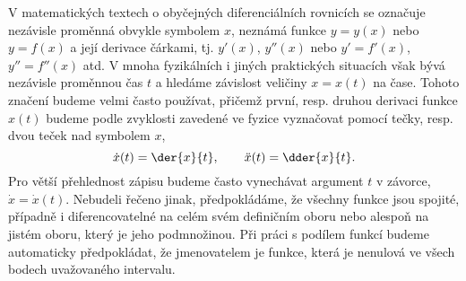     \begin{mdframed}[style=mdnote] 
      V matematických textech o obyčejných diferenciálních rovnicích se označuje nezávisle proměnná
      obvykle symbolem \(x\), neznámá funkce \(y = y(x)\) nebo \(y = f(x)\) a její derivace čárkami,
      tj. \(y'(x)\), \(y''(x)\) nebo \(y' = f'(x)\), \(y'' = f''(x)\) atd. V mnoha fyzikálních i
      jiných praktických situacích však bývá nezávisle proměnnou čas \(t\) a hledáme závislost
      veličiny \(x = x(t)\) na čase. Tohoto značení budeme velmi často používat, přičemž první,
      resp. druhou derivaci funkce \(x(t)\) budeme podle zvyklosti zavedené ve fyzice vyznačovat
      pomocí tečky, resp. dvou teček nad symbolem \(x\),
      \begin{equation*}
        \dot{x}(t) = \der{x}{t}, \qquad \ddot{x}(t) = \dder{x}{t}.
      \end{equation*}
      Pro větší přehlednost zápisu budeme často vynechávat argument \(t\) v závorce, \(\dot{x} = 
      \dot{x}(t)\). Nebudeli řečeno jinak, předpokládáme, že všechny funkce jsou spojité, případně 
      i diferencovatelné na celém svém definičním oboru nebo alespoň na jistém oboru, který je jeho 
      podmnožinou. Při práci s podílem funkcí budeme automaticky předpokládat, že jmenovatelem je 
      funkce, která je nenulová ve všech bodech uvažovaného intervalu.      
    \end{mdframed}
    
